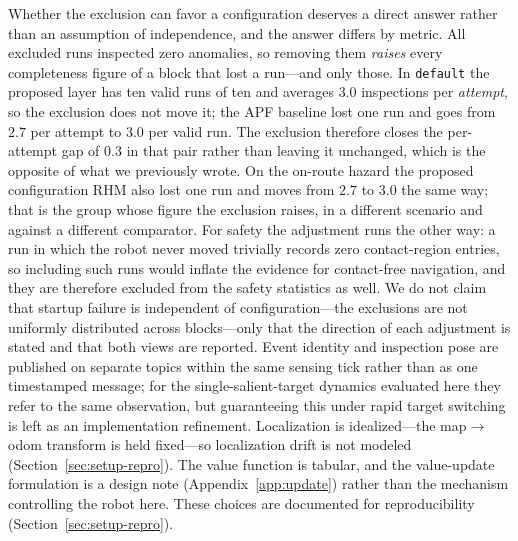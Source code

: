 Whether the exclusion can favor a configuration deserves a direct answer rather than
an assumption of independence, and the answer differs by metric. All excluded runs
inspected zero anomalies, so removing them \emph{raises} every completeness figure
of a block that lost a run---and only those. In \texttt{default} the proposed
layer has ten valid runs of ten and averages $3.0$ inspections per \emph{attempt},
so the exclusion does not move it; the APF baseline lost one run and goes from
$2.7$ per attempt to $3.0$ per valid run. The exclusion therefore closes the
per-attempt gap of $0.3$ in that pair rather than leaving it unchanged, which is
the opposite of what we previously wrote. On the on-route hazard the proposed
configuration RHM also lost one run and moves from $2.7$ to $3.0$ the same way;
that is the group whose figure the exclusion raises, in a different scenario and
against a different comparator. For
safety the adjustment runs the other way: a run in which the robot never moved
trivially records zero contact-region entries, so including such runs would inflate
the evidence for contact-free navigation, and they are therefore excluded from the
safety statistics as well. We do not claim that startup failure is independent of
configuration---the exclusions are not uniformly distributed across blocks---only
that the direction of each adjustment is stated and that both views are reported. Event identity and inspection pose are published on
separate topics within the same sensing tick rather than as one timestamped
message; for the single-salient-target dynamics evaluated here they refer to the
same observation, but guaranteeing this under rapid target switching is left as an
implementation refinement. Localization is idealized---the
map$\rightarrow$odom transform is held fixed---so localization drift is not modeled
(Section~\ref{sec:setup-repro}). The value function is tabular, and the
value-update formulation is a design note (Appendix~\ref{app:update}) rather than
the mechanism controlling the robot here. These
choices are documented for reproducibility (Section~\ref{sec:setup-repro}).


